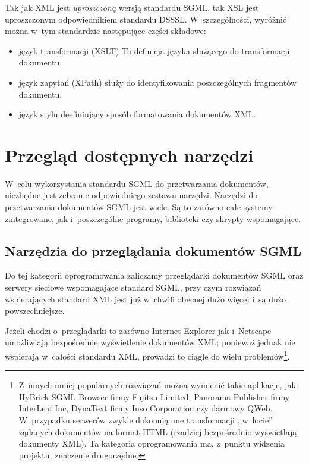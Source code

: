\documentclass[brudnopis]{xmgr}
\begin{document}
Tak jak XML jest \emph{uproszczoną\/} wersją standardu SGML, tak XSL
jest uproszczonym odpowiednikiem standardu DSSSL. W~szczególności,
wyróżnić można w~tym standardzie następujące części składowe:

\begin{itemize}
\item język transformacji (XSLT) To definicja języka służącego do
  transformacji dokumentu.      
\item język zapytań (XPath) służy do identyfikowania poszczególnych
  fragmentów dokumentu.
\item język stylu deefiniujący sposób formatowania dokumentów XML.
\end{itemize}

\chapter{Przegląd dostępnych narzędzi\label{PRZEGLAD.NARZEDZI}}

W~celu wykorzystania standardu SGML do przetwarzania dokumentów,
niezbędne jest zebranie odpowiedniego zestawu narzędzi. Narzędzi do
przetwarzania dokumentów SGML jest wiele. Są to zarówno całe
systemy zintegrowane, jak i~poszczególne programy, biblioteki czy
skrypty wspomagające.
    
\section{Narzędzia do przeglądania dokumentów SGML}

Do tej kategorii oprogramowania zaliczamy przeglądarki dokumentów
SGML oraz serwery sieciowe wspomagające standard SGML, przy
czym rozwiązań wspierających standard XML jest już w~chwili obecnej
dużo więcej i~są dużo powszechniejsze.

Jeżeli chodzi o~przeglądarki to zarówno Internet Explorer jak
i~Netscape umożliwiają bezpośrednie wyświetlenie dokumentów XML;
ponieważ jednak nie wspierają w~całości standardu XML, prowadzi to
ciągle do wielu problemów\footnote{Z~innych mniej popularnych
  rozwiązań można wymienić takie aplikacje, jak: HyBrick SGML
  Browser firmy Fujitsu Limited, Panorama Publisher firmy InterLeaf
  Inc, DynaText firmy Inso Corporation czy darmowy QWeb. W~przypadku
  serwerów zwykle dokonują one transformacji ,,w~locie'' żądanych
  dokumentów na format HTML (rzadziej bezpośrednio wyświetlają
  dokumenty XML).  Ta kategoria oprogramowania ma, z~punktu widzenia
  projektu, znaczenie drugorzędne.}.
      
\end{document}
